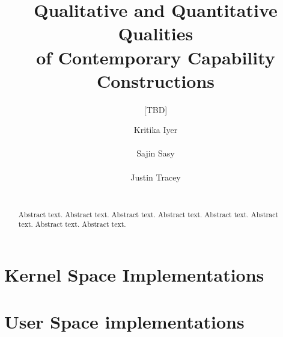 \documentclass{acm_proc_article-sp}
\begin{document}
\title{Qualitative and Quantitative Qualities \\ of Contemporary Capability Constructions}
\subtitle{[TBD]}

\author{
\alignauthor
Kritika Iyer\\
       \\
\alignauthor
Sajin Sasy\\
       \\
\alignauthor
Justin Tracey\\
       \\
}

\date{}


\maketitle
\begin{abstract}
Abstract text. Abstract text. Abstract text. Abstract text. Abstract text. Abstract text. Abstract text. Abstract text.
\end{abstract}




	

\section{Kernel Space Implementations}
 
 


\hfill
\section{User Space implementations}
	
	
	










\end{document}

